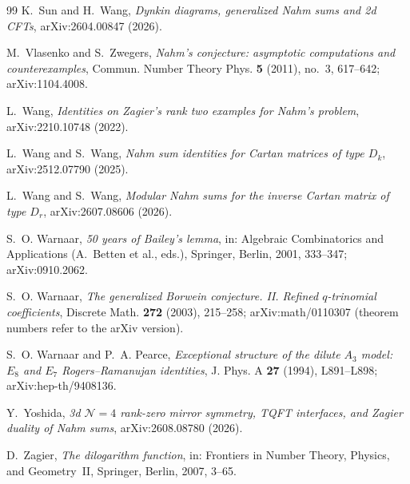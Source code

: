 \documentclass[11pt]{amsart}
\theoremstyle{definition}
\numberwithin{equation}{section}
\begin{document}
\begin{thebibliography}{99}
 K.~Sun and H.~Wang, \emph{Dynkin diagrams, generalized Nahm sums and 2d CFTs},
arXiv:2604.00847 (2026).

 M.~Vlasenko and S.~Zwegers, \emph{Nahm's conjecture: asymptotic computations and
counterexamples}, Commun. Number Theory Phys. \textbf{5} (2011), no.~3, 617--642; arXiv:1104.4008.

 L.~Wang, \emph{Identities on Zagier's rank two examples for Nahm's problem},
arXiv:2210.10748 (2022).

 L.~Wang and S.~Wang, \emph{Nahm sum identities for Cartan matrices of type $D_k$},
arXiv:2512.07790 (2025).

 L.~Wang and S.~Wang, \emph{Modular Nahm sums for the inverse Cartan matrix of type $D_r$},
arXiv:2607.08606 (2026).

 S.~O. Warnaar, \emph{50 years of Bailey's lemma}, in: Algebraic Combinatorics and
Applications (A.~Betten et al., eds.), Springer, Berlin, 2001, 333--347; arXiv:0910.2062.

 S.~O. Warnaar, \emph{The generalized Borwein conjecture. II. Refined $q$-trinomial
coefficients}, Discrete Math. \textbf{272} (2003), 215--258; arXiv:math/0110307 (theorem numbers refer to
the arXiv version).

 S.~O. Warnaar and P.~A. Pearce, \emph{Exceptional structure of the dilute $A_3$ model: $E_8$
and $E_7$ Rogers--Ramanujan identities}, J. Phys. A \textbf{27} (1994), L891--L898; arXiv:hep-th/9408136.

 Y.~Yoshida, \emph{3d $\mathcal N=4$ rank-zero mirror symmetry, TQFT interfaces, and
Zagier duality of Nahm sums}, arXiv:2608.08780 (2026).

 D.~Zagier, \emph{The dilogarithm function}, in: Frontiers in Number Theory, Physics, and
Geometry~II, Springer, Berlin, 2007, 3--65.

\end{thebibliography}
\end{document}
